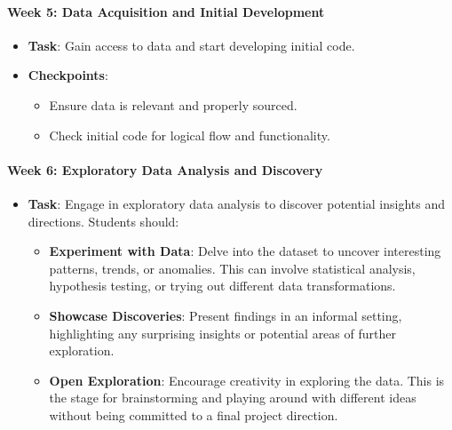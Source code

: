 \documentclass[
  letterpaper,
  DIV=11,
  numbers=noendperiod]{scrartcl}
\let\oldparagraph\paragraph
\renewcommand{\paragraph}[1]{\oldparagraph{#1}\mbox{}}
\providecommand{\tightlist}{%
  \setlength{\itemsep}{0pt}\setlength{\parskip}{0pt}}\usepackage{longtable,booktabs,array}
\begin{document}
\hypertarget{week-5-data-acquisition-and-initial-development}{%
\paragraph{Week 5: Data Acquisition and Initial
Development}\label{week-5-data-acquisition-and-initial-development}}

\begin{itemize}
\tightlist
\item
  \textbf{Task}: Gain access to data and start developing initial code.
\item
  \textbf{Checkpoints}:

  \begin{itemize}
  \tightlist
  \item
    Ensure data is relevant and properly sourced.
  \item
    Check initial code for logical flow and functionality.
  \end{itemize}
\end{itemize}

\hypertarget{week-6-exploratory-data-analysis-and-discovery}{%
\paragraph{Week 6: Exploratory Data Analysis and
Discovery}\label{week-6-exploratory-data-analysis-and-discovery}}

\begin{itemize}
\tightlist
\item
  \textbf{Task}: Engage in exploratory data analysis to discover
  potential insights and directions. Students should:

  \begin{itemize}
  \tightlist
  \item
    \textbf{Experiment with Data}: Delve into the dataset to uncover
    interesting patterns, trends, or anomalies. This can involve
    statistical analysis, hypothesis testing, or trying out different
    data transformations.
  \item
    \textbf{Showcase Discoveries}: Present findings in an informal
    setting, highlighting any surprising insights or potential areas of
    further exploration.
  \item
    \textbf{Open Exploration}: Encourage creativity in exploring the
    data. This is the stage for brainstorming and playing around with
    different ideas without being committed to a final project
    direction.
  \end{itemize}
\end{itemize}
\end{document}
